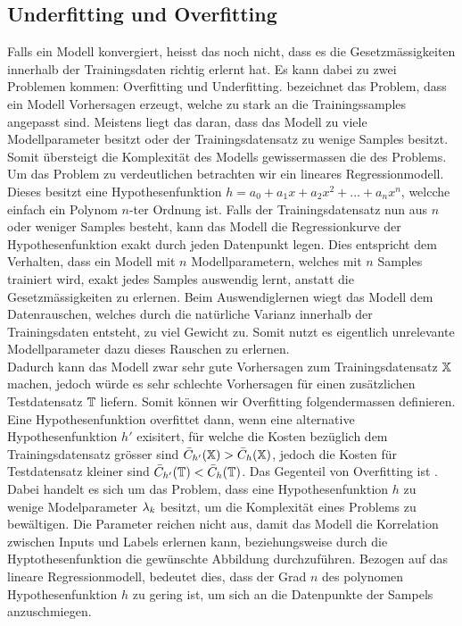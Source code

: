 \subsection{Underfitting und Overfitting}
Falls ein Modell konvergiert, heisst das noch nicht, dass es die
Gesetzmässigkeiten innerhalb der Trainingsdaten richtig erlernt hat.
Es kann dabei zu zwei Problemen kommen: Overfitting und Underfitting.
\para{}
 bezeichnet das Problem, dass ein Modell Vorhersagen
erzeugt, welche zu stark an die Trainingssamples angepasst sind.
Meistens liegt das daran, dass das Modell zu viele Modellparameter besitzt oder
der Trainingsdatensatz zu wenige Samples besitzt.
Somit übersteigt die Komplexität des Modells gewissermassen die des Problems.
\para{}
Um das Problem zu verdeutlichen betrachten wir ein lineares Regressionmodell.
Dieses besitzt eine Hypothesenfunktion $h = a_0 + a_1 x + a_2 x^2 + \ldots + a_n
x^n$, welcche einfach ein Polynom $n$-ter Ordnung ist. Falls der
Trainingsdatensatz nun aus $n$ oder weniger Samples besteht, kann das Modell die
Regressionkurve der Hypothesenfunktion exakt durch jeden Datenpunkt legen.
Dies entspricht dem Verhalten, dass ein Modell mit $n$ Modellparametern, welches
mit $n$ Samples trainiert wird, exakt jedes Samples auswendig lernt, anstatt die
Gesetzmässigkeiten zu erlernen.
Beim Auswendiglernen
wiegt das Modell dem Datenrauschen, welches durch die natürliche Varianz
innerhalb der Trainingsdaten entsteht, zu viel Gewicht zu. Somit nutzt es
eigentlich unrelevante Modellparameter dazu dieses Rauschen zu erlernen. \\
Dadurch kann das Modell zwar sehr gute Vorhersagen zum Trainingsdatensatz
$\mathbb{X}$ machen, jedoch würde es sehr schlechte Vorhersagen für einen
zusätzlichen Testdatensatz $\mathbb{T}$ liefern.
\para{}
Somit können wir Overfitting folgendermassen definieren. Eine
Hypothesenfunktion overfittet dann, wenn eine alternative Hypothesenfunktion
$h'$ exisitert, für welche die Kosten bezüglich dem Trainingsdatensatz
grösser sind $\bar{C}_{h'}(\mathbb{X}) > \bar{C}_h(\mathbb{X})$, jedoch die Kosten
für Testdatensatz kleiner sind $\bar{C}_{h'}(\mathbb{T}) < \bar{C}_h(\mathbb{T})$.
\para{}
Das Gegenteil von Overfitting ist . Dabei handelt es sich um das Problem, dass eine
Hypothesenfunktion $h$ zu
wenige Modelparameter $\lambda_k$ besitzt, um die Komplexität eines Problems zu bewältigen.
Die Parameter reichen nicht aus, damit das Modell die Korrelation zwischen
Inputs und Labels erlernen kann, beziehungsweise durch die Hyptothesenfunktion
die gewünschte Abbildung durchzuführen.
\para{}
Bezogen auf das lineare Regressionmodell, bedeutet dies, dass der Grad $n$ des
polynomen Hypothesenfunktion $h$ zu gering ist, um sich an die Datenpunkte der
Sampels anzuschmiegen.

